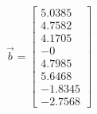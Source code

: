 \begin{equation} \Vec{b} = \begin{bmatrix}  5.0385\\  4.7582\\  4.1705\\      -0\\  4.7985\\  5.6468\\ -1.8345\\ -2.7568 \end{bmatrix} \label{eqsol} \end{equation}